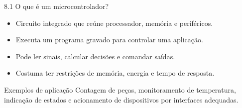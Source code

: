 \begin{frame}[t]{8.1 O que é um microcontrolador?}
\begin{itemize}
\item Circuito integrado que reúne processador, memória e periféricos.
\item Executa um programa gravado para controlar uma aplicação.
\item Pode ler sinais, calcular decisões e comandar saídas.
\item Costuma ter restrições de memória, energia e tempo de resposta.
\end{itemize}
\begin{exampleblock}{Exemplos de aplicação}
Contagem de peças, monitoramento de temperatura, indicação de estados e acionamento de dispositivos por interfaces adequadas.
\end{exampleblock}
\end{frame}
